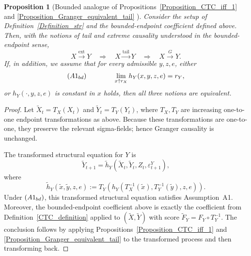 \documentclass[a4paper,11pt]{article}
\newtheorem{proposition}{Proposition}
\begin{document}
\begin{proposition}[Bounded analogue of Propositions~\ref{Proposition_CTC_iff_1} and
\ref{Proposition_Granger_equivalent_tail} ]
Consider the setup of Definition~\ref{Definition_str} and the bounded-endpoint
coefficient defined above. Then, with the notions of tail and extreme causality
understood in the bounded-endpoint sense,
\[
    X \stackrel{\mathrm{ext}}{\longrightarrow} Y
    \quad\Longrightarrow\quad
    X \stackrel{\mathrm{tail}}{\longrightarrow} Y
    \quad\Longrightarrow\quad
    X \stackrel{G}{\longrightarrow} Y .
\]
If, in addition, we assume that for every admissible \(y,z,e\), either
\[
(A1_{\rm bd})\qquad\qquad    \lim_{x\uparrow r_X} h_Y(x,y,z,e)=r_Y,
\]
or \(h_Y(\cdot,y,z,e)\) is constant in \(x\) holds, then all three notions are equivalent.
\end{proposition}


\begin{proof}
Let \(\widetilde X_t=T_X(X_t)\) and \(\widetilde Y_t=T_Y(Y_t)\), where
\(T_X,T_Y\) are increasing one-to-one endpoint transformations as above.
Because these transformations are one-to-one, they preserve the relevant
sigma-fields; hence Granger causality is unchanged.

The transformed structural equation for \(Y\) is
\[
    \widetilde Y_{t+1}
    =
    \widetilde h_Y(\widetilde X_t,\widetilde Y_t,Z_t,\varepsilon^Y_{t+1}),
\]
where
\[
    \widetilde h_Y(\widetilde x,\widetilde y,z,e)
    :=
    T_Y\!\left(
        h_Y(T_X^{-1}(\widetilde x),T_Y^{-1}(\widetilde y),z,e)
    \right).
\]
Under \((A1_{\rm bd})\), this transformed structural equation satisfies
Assumption~A1. Moreover, the bounded-endpoint coefficient above is exactly the
coefficient from Definition~\ref{CTC_definition} applied to
\((\widetilde X,\widetilde Y)\) with score
\(\widetilde F_Y=F_Y\circ T_Y^{-1}\). The conclusion follows by applying
Propositions~\ref{Proposition_CTC_iff_1} and
\ref{Proposition_Granger_equivalent_tail} to the transformed process and then
transforming back.
\end{proof}
\end{document}
